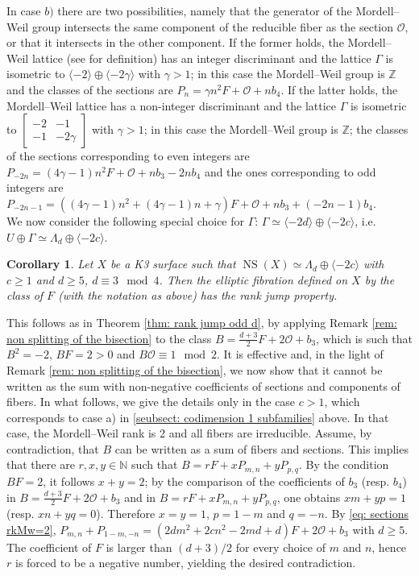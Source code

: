 \documentclass{amsart}
\newtheorem{corollary}[theorem]{Corollary}
\theoremstyle{definition}
\numberwithin{equation}{section}
\newcommand{\Z}{\mathbb{Z}}
\renewcommand{\O}{\mathcal{O}}
\DeclareMathOperator{\NS}{NS}
\begin{document}
In case $b)$ there are two possibilities, namely that the generator of the Mordell--Weil group intersects the same component of the reducible fiber  as the section $\O$, or that it intersects in the other component. If the former holds, the Mordell--Weil lattice (see \cite[Section 11]{ScS} for definition) has an integer discriminant and the lattice $\Gamma$ is isometric to $\langle-2\rangle\oplus \langle -2\gamma\rangle$ with $\gamma>1$; in this case the Mordell--Weil group is $\Z$ and the classes of the sections are $P_n=\gamma n^2 F+\O+nb_4$.
If the latter holds, the Mordell--Weil lattice has a non-integer discriminant and the lattice $\Gamma$ is isometric to $\left[\begin{array}{cc}-2&-1\\-1&-2\gamma\end{array}\right]$ with $\gamma>1$; in this case the Mordell--Weil group is $\Z$; the classes of the sections corresponding to even integers are $P_{-2n}=(4\gamma-1) n^2 F+\O+nb_3-2nb_4$ and the ones corresponding to odd integers are $P_{-2n-1}=\left((4\gamma-1) n^2+(4\gamma-1)n+\gamma\right) F+\O+nb_3+(-2n-1)b_4$.\\


We now consider the following special choice for $\Gamma$:  $\Gamma\simeq \langle -2d\rangle \oplus\langle -2c\rangle$, i.e. $U\oplus \Gamma\simeq \Lambda_{d}\oplus \langle -2c\rangle$.
\begin{corollary}\label{cor: rank jump general rank 4}
Let $X$ be a K3 surface such that $\NS(X)\simeq \Lambda_{d}\oplus \langle -2c\rangle$ with $c\geq 1$ and $d\geq 5$, $d\equiv 3\mod 4$. Then the elliptic fibration defined on $X$ by the class of $F$ (with the notation as above) has the rank jump property.
\end{corollary}
\proof This follows as in Theorem \ref{thm: rank jump odd d}, by applying Remark \ref{rem: non splitting of the bisection} to the class $B=\frac{d+3}{2}F+2\O+b_3$, which is such that $B^2=-2$, $BF=2>0$ and $B\mathcal{O}\equiv 1\mod 2$. It is effective and,  in the light of Remark \ref{rem: non splitting of the bisection}, we now show that it cannot be written as the sum with non-negative coefficients of  sections and components of fibers.  %
In what follows, we give the details only in the case $c>1$, which corresponds to case a) in \ref{seubsect: codimension 1 subfamilies} above. In that case, the Mordell--Weil rank is 2 and all fibers are irreducible. Assume, by contradiction, that $B$ can be written as a sum of fibers and sections. This implies that there are $r,x,y\in\mathbb{N}$ such that $B=rF+xP_{m,n}+yP_{p,q}$. 
By the condition $BF=2$, it follows $x+y=2$; by the comparison of the coefficients of $b_3$ (resp. $b_4$) in $B=\frac{d+3}{2}F+2\O+b_3$ and in $B=rF+xP_{m,n}+yP_{p,q}$, one obtains $xm+yp=1$ (resp. $xn+yq=0$). Therefore $x=y=1$, $p=1-m$ and $q=-n$. By \eqref{eq: sections rkMw=2}, $P_{m,n}+P_{1-m,-n}=(2dm^2+2cn^2-2md+d)F+2\O+b_3$  with $d\geq 5$. The coefficient of $F$ is larger than $(d+3)/2$ for every choice of $m$ and $n$, hence $r$ is forced to be a negative number, yielding the desired contradiction.
\end{document}
